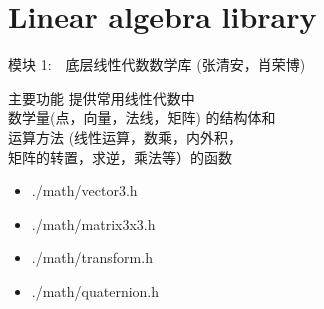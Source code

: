 \documentclass{beamer}
\begin{document}
\section{Linear algebra library}
\begin{frame} {模块 1:　底层线性代数数学库 (张清安，肖荣博) }
\begin{block}{主要功能}
    提供常用线性代数中 \\ 数学量(点，向量，法线，矩阵) 的结构体和 \\ 运算方法 (线性运算，数乘，内外积，\\ 矩阵的转置，求逆，乘法等）的函数
  \end{block}
\begin{itemize}
			\item \begin{semiverbatim}
    ./math/vector3.h
  \end{semiverbatim}
			\item \begin{semiverbatim}
    ./math/matrix3x3.h
  \end{semiverbatim}
			\item \begin{semiverbatim}
    ./math/transform.h
  \end{semiverbatim}
\item \begin{semiverbatim}
    ./math/quaternion.h
  \end{semiverbatim}
\end{itemize}
\end{frame}
\end{document}
